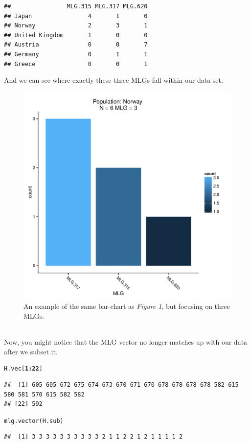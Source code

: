 \documentclass[letterpaper]{article}\usepackage[]{graphicx}\usepackage[]{color}
\makeatletter
\newcommand{\hlnum}[1]{\textcolor[rgb]{0.502,0,0.502}{\textbf{#1}}}%
\newcommand{\hlopt}[1]{\textcolor[rgb]{1,0,0.502}{\textbf{#1}}}%
\newcommand{\hlstd}[1]{\textcolor[rgb]{0,0,0}{#1}}%
\newcommand{\hlkwd}[1]{\textcolor[rgb]{0,0.267,0.4}{#1}}%
\newenvironment{kframe}{%
 \def\at@end@of@kframe{}%
 \ifinner\ifhmode%
  \def\at@end@of@kframe{\end{minipage}}%
  \begin{minipage}{\columnwidth}%
 \fi\fi%
 \def\FrameCommand##1{\hskip\@totalleftmargin \hskip-\fboxsep
 \colorbox{shadecolor}{##1}\hskip-\fboxsep
     \hskip-\linewidth \hskip-\@totalleftmargin \hskip\columnwidth}%
 \MakeFramed {\advance\hsize-\width
   \@totalleftmargin\z@ \linewidth\hsize
   \@setminipage}}%
 {\par\unskip\endMakeFramed%
 \at@end@of@kframe}
\newenvironment{knitrout}{}{} %
\makeatother
\begin{document}
\begin{knitrout}\footnotesize
{}\color{fgcolor}\begin{kframe}
\begin{verbatim}
##                MLG.315 MLG.317 MLG.620
## Japan                4       1       0
## Norway               2       3       1
## United Kingdom       1       0       0
## Austria              0       0       7
## Germany              0       1       1
## Greece               0       0       1
\end{verbatim}
\end{kframe}
\end{knitrout}

And we can see where exactly these three MLGs fall within our data set.
\begin{figure}[h!]
  \centering
  \caption{\footnotesize An example of the same bar-chart as \textit{Figure 1}, but focusing on three MLGs.}
  \label{nortable2}
\begin{knitrout}\footnotesize
{}\color{fgcolor}

{\centering \includegraphics[width=0.5\linewidth]{figure/subnor} 

}



\end{knitrout}

\end{figure}
\\
\newpage
Now, you might notice that the MLG vector no longer matches up with our data after we subset it.
\begin{knitrout}\footnotesize
{}\color{fgcolor}\begin{kframe}
\begin{alltt}
\hlstd{H.vec[}\hlnum{1}\hlopt{:}\hlnum{22}\hlstd{]}
\end{alltt}
\begin{verbatim}
##  [1] 605 605 672 675 674 673 670 671 670 678 678 678 678 582 615 580 581 570 615 582 582
## [22] 592
\end{verbatim}
\begin{alltt}
\hlkwd{mlg.vector}\hlstd{(H.sub)}
\end{alltt}
\begin{verbatim}
##  [1] 3 3 3 3 3 3 3 3 3 3 2 1 1 2 2 1 2 1 1 1 1 2
\end{verbatim}
\end{kframe}
\end{knitrout}
\end{document}

